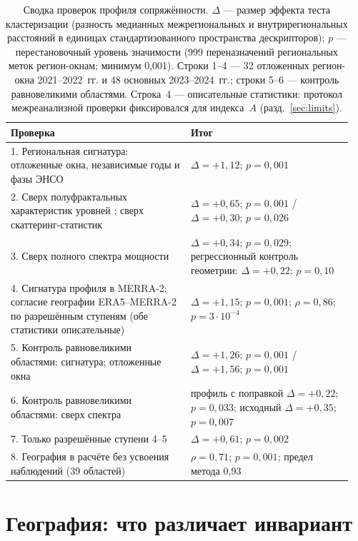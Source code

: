 \documentclass[11pt,a4paper]{article}
\begin{document}
\begin{table}[tbp]
\centering\small
\caption{Сводка проверок профиля сопряжённости. $\Delta$ --- размер эффекта теста кластеризации (разность медианных межрегиональных и внутрирегиональных расстояний в единицах стандартизованного пространства дескрипторов); $p$ --- перестановочный уровень значимости (999 переназначений региональных меток регион-окнам; минимум 0,001). Строки 1--4 --- 32 отложенных регион-окна 2021--2022~гг. и 48 основных 2023--2024~гг.; строки 5--6 --- контроль равновеликими областями. Строка~4 --- описательные статистики: протокол межреанализной проверки фиксировался для индекса~$A$ (разд.~\ref{sec:limits}).}
\label{tab:summary}
\begin{tabular}{@{}p{0.5\linewidth}p{0.45\linewidth}@{}}
\toprule
Проверка & Итог\\
\midrule
1. Региональная сигнатура: отложенные окна, независимые годы и фазы ЭНСО & $\Delta=+1{,}12$; $p=0{,}001$\\
2. Сверх полуфрактальных характеристик уровней \cite{Krenke2019}; сверх скаттеринг-статистик \cite{Cheng2024} & $\Delta=+0{,}65$; $p=0{,}001$ / $\Delta=+0{,}30$; $p=0{,}026$\\
3. Сверх полного спектра мощности & $\Delta=+0{,}34$; $p=0{,}029$; регрессионный контроль геометрии: $\Delta=+0{,}22$; $p=0{,}10$\\
4. Сигнатура профиля в MERRA-2; согласие географии ERA5--MERRA-2 по разрешённым ступеням (обе статистики описательные) & $\Delta=+1{,}15$; $p=0{,}001$; $\rho=0{,}86$; $p=3\cdot10^{-4}$\\
5. Контроль равновеликими областями: сигнатура; отложенные окна & $\Delta=+1{,}26$; $p=0{,}001$ / $\Delta=+1{,}56$; $p=0{,}001$\\
6. Контроль равновеликими областями: сверх спектра & профиль с поправкой $\Delta=+0{,}22$; $p=0{,}033$; исходный $\Delta=+0{,}35$; $p=0{,}007$\\
7. Только разрешённые ступени 4--5 & $\Delta=+0{,}61$; $p=0{,}002$\\
8. География в расчёте без усвоения наблюдений (39 областей) & $\rho=0{,}71$; $p=0{,}001$; предел метода 0,93\\
\bottomrule
\end{tabular}
\end{table}

\section{География: что различает инвариант}
\label{sec:geo}
\end{document}
